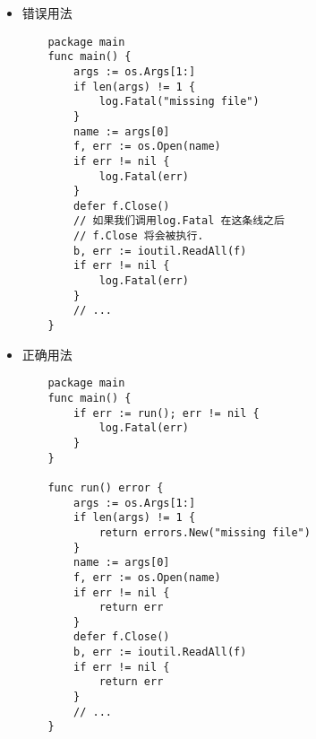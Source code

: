 \begin{itemize}[leftmargin=4em]
\item 错误用法

  \begin{verbatim}
    package main
    func main() {
    	args := os.Args[1:]
    	if len(args) != 1 {
    		log.Fatal("missing file")
    	}
    	name := args[0]
    	f, err := os.Open(name)
    	if err != nil {
    		log.Fatal(err)
    	}
    	defer f.Close()
    	// 如果我们调用log.Fatal 在这条线之后
    	// f.Close 将会被执行.
    	b, err := ioutil.ReadAll(f)
    	if err != nil {
    		log.Fatal(err)
    	}
    	// ...
    }
  \end{verbatim}
\item 正确用法

  \begin{verbatim}
    package main
    func main() {
    	if err := run(); err != nil {
    		log.Fatal(err)
    	}
    }

    func run() error {
    	args := os.Args[1:]
    	if len(args) != 1 {
    		return errors.New("missing file")
    	}
    	name := args[0]
    	f, err := os.Open(name)
    	if err != nil {
    		return err
    	}
    	defer f.Close()
    	b, err := ioutil.ReadAll(f)
    	if err != nil {
    		return err
    	}
    	// ...
    }
  \end{verbatim}
\end{itemize}
